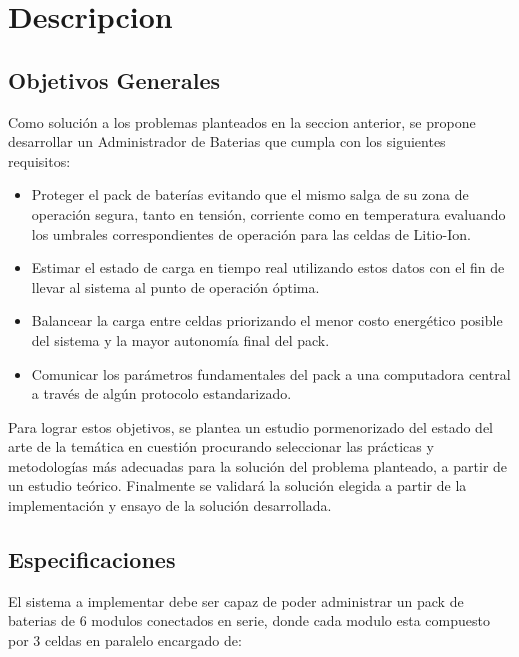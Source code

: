 \documentclass[10pt,a4paper]{article}
\begin{document}
\clearpage

\section{Descripcion}\label{descripcion}

\subsection{Objetivos Generales}

Como solución a los problemas planteados en la seccion anterior, se propone
desarrollar un Administrador de Baterias que cumpla con los siguientes
requisitos:

\begin{itemize}
    \item Proteger el pack de baterías evitando que el mismo salga de su 
	zona de operación segura, tanto en tensión, corriente como en 
	temperatura evaluando los umbrales correspondientes de operación para 
	las celdas de Litio-Ion.
    \item Estimar el estado de carga en tiempo real utilizando estos datos 
	con el fin de llevar al sistema al punto de operación óptima.
    \item Balancear la carga entre celdas priorizando el menor costo 
	energético posible del sistema y la mayor autonomía final del pack.
    \item Comunicar los parámetros fundamentales del pack a una computadora 
	central a través de algún protocolo estandarizado.
\end{itemize}

\noindent Para lograr estos objetivos, se plantea un estudio pormenorizado 
del estado del arte de la temática en cuestión procurando seleccionar las 
prácticas y metodologías más adecuadas para la solución del problema 
planteado, a partir de un estudio teórico. Finalmente se validará la 
solución elegida a partir de la implementación y ensayo de la solución 
desarrollada.

\subsection{Especificaciones}

\noindent El sistema a implementar debe ser capaz de poder administrar un 
pack de baterias de 6 modulos conectados en serie, donde cada modulo esta 
compuesto por 3 celdas en paralelo encargado de: 
\end{document}
